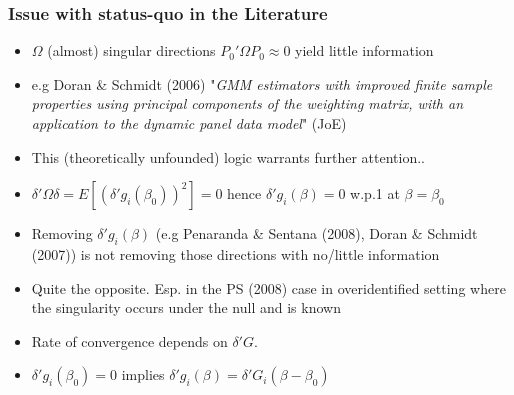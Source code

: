 \documentclass{beamer}
\begin{document}
    \begin{frame}
    \frametitle{Issue with status-quo in the Literature}
    \begin{itemize}

    \item[] $\Omega$ (almost) singular  directions $P_0'\Omega P_0\approx0$ yield little information
    \vspace{5pt}
    \item[] e.g Doran \& Schmidt (2006) "\textit{GMM estimators with improved finite sample properties using principal components of the weighting matrix, with an application to the dynamic panel data model}" (JoE)
    \vspace{8pt}

    \item[] This (theoretically unfounded) logic warrants further attention..
    \pause\vspace{5pt}
\item[] $\delta'\Omega \delta=E[(\delta'g_i(\beta_0))^2]=0$ hence $\delta'g_i(\beta)=0$ w.p.1 at $\beta=\beta_0$

  \pause\vspace{5pt}
\item[] Removing $\delta'g_i(\beta)$ (e.g Penaranda \& Sentana (2008), Doran \& Schmidt (2007)) is not removing those directions with no/little information
  \pause\vspace{5pt}
\item[] Quite the opposite. Esp. in the PS (2008) case in overidentified setting where the singularity occurs under the null and is known
  \pause\vspace{5pt}
\item[] Rate of convergence depends on $\delta'G$.
  \pause\vspace{5pt}
\item[] $\delta'g_i(\beta_0)=0$ implies $\delta'g_i(\beta)=\delta'G_i(\beta-\beta_0)$


    \end{itemize}
    \end{frame}
\end{document}
